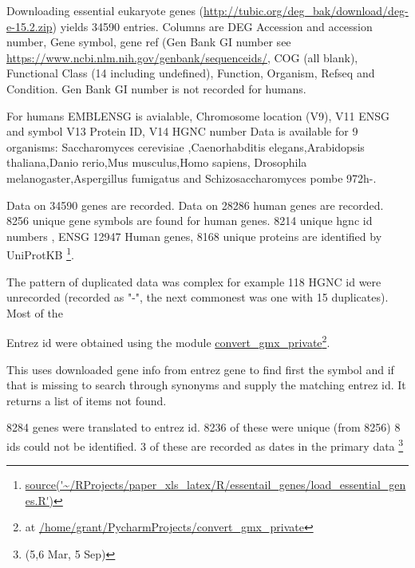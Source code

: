  Downloading essential eukaryote genes (\url{http://tubic.org/deg_bak/download/deg-e-15.2.zip}) yields 34590 entries. Columns are DEG Accession and  accession number, Gene symbol, gene ref (Gen Bank GI number see \url{https://www.ncbi.nlm.nih.gov/genbank/sequenceids/}, COG (all blank), Functional Class (14 including undefined), Function, Organism, Refseq and Condition. Gen Bank GI number is not recorded for humans.
  
  For humans EMBLENSG is avialable, Chromosome location (V9), V11 ENSG and symbol V13 Protein ID, V14 HGNC number
 Data is available for 9 organisms:  Saccharomyces cerevisiae   ,Caenorhabditis elegans,Arabidopsis thaliana,Danio rerio,Mus musculus,Homo sapiens,
 Drosophila melanogaster,Aspergillus fumigatus and Schizosaccharomyces pombe 972h-.
 
 Data on 34590 genes are recorded. 
 Data on 28286  human genes are recorded. 8256 unique gene symbols are found for human genes. 8214 unique hgnc id numbers  , ENSG 12947 Human genes, 8168 unique proteins  are identified by UniProtKB  \footnote{\url{source('~/RProjects/paper_xls_latex/R/essentail_genes/load_essential_genes.R')}}.
 
 The pattern of duplicated data was complex for example 118 HGNC id were unrecorded (recorded as "-", the next commonest was one with 15 duplicates). Most of the 
 
 Entrez id were obtained using the module \url{convert_gmx_private}\footnote{ at \url{/home/grant/PycharmProjects/convert_gmx_private}}.
 
 This uses downloaded gene info from entrez gene to find first the symbol and if that is missing to search through synonyms and supply the matching entrez id. It returns a list of items not found. 
 
8284 genes were translated to entrez id. 8236 of these were unique (from 8256) 8 ids could not be identified. 3 of these are recorded as dates in the primary data \footnote{(5,6 Mar, 5 Sep)}
 
